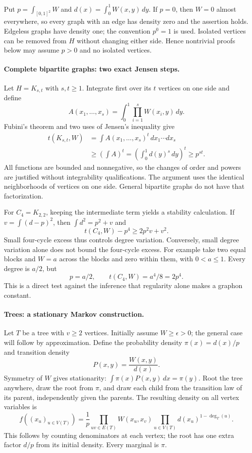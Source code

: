 \documentclass[11pt]{article}
\begin{document}
Put $p=\int_{[0,1]^2}W$ and $d(x)=\int_0^1W(x,y)\,dy$.
If $p=0$, then $W=0$ almost everywhere, so every graph with an edge
has density zero and the assertion holds. Edgeless graphs have density
one; the convention $p^0=1$ is used. Isolated vertices can be removed
from $H$ without changing either side. Hence nontrivial proofs below
may assume $p>0$ and no isolated vertices.

\paragraph{Complete bipartite graphs: two exact Jensen steps.}
Let $H=K_{s,t}$ with $s,t\ge1$. Integrate first over its $t$ vertices
on one side and define
\[
 A(x_1,\ldots,x_s)=\int_0^1\prod_{i=1}^sW(x_i,y)\,dy.
\]
Fubini's theorem and two uses of Jensen's inequality give
\[
 \begin{split}
 t(K_{s,t},W)&=\int A(x_1,\ldots,x_s)^t\,dx_1\cdots dx_s\\
 &\ge\left(\int A\right)^t
   =\left(\int_0^1d(y)^s\,dy\right)^t
   \ge p^{st}.
 \end{split}                                             \tag{1}
\]
All functions are bounded and nonnegative, so the changes of order
and powers are justified without integrability qualifications.
The argument uses the identical neighborhoods of vertices on one
side. General bipartite graphs do not have that factorization.

For $C_4=K_{2,2}$, keeping the intermediate term yields a stability
calculation. If $v=\int(d-p)^2$, then $\int d^2=p^2+v$ and
\[
                     t(C_4,W)-p^4\ge2p^2v+v^2.           \tag{2}
\]
Small four-cycle excess thus controls degree variation. Conversely,
small degree variation alone does not bound the four-cycle excess.
For example take two equal blocks and $W=a$ across the blocks and
zero within them, with $0<a\le1$. Every degree is $a/2$, but
\[
                  p=a/2,\qquad t(C_4,W)=a^4/8=2p^4.
\]
This is a direct test against the inference that regularity alone
makes a graphon constant.

\paragraph{Trees: a stationary Markov construction.}
Let $T$ be a tree with $v\ge2$ vertices. Initially assume $W\ge\epsilon>0$;
the general case will follow by approximation. Define the probability
density $\pi(x)=d(x)/p$ and transition density
\[
                            P(x,y)=\frac{W(x,y)}{d(x)}.
\]
Symmetry of $W$ gives stationarity:
$\int\pi(x)P(x,y)\,dx=\pi(y)$.
Root the tree anywhere, draw the root from $\pi$, and draw each child
from the transition law of its parent, independently given the parents.
The resulting density on all vertex variables is
\[
 f((x_u)_{u\in V(T)})=
 \frac1p\prod_{uv\in E(T)}W(x_u,x_v)
                    \prod_{u\in V(T)}d(x_u)^{1-\deg_T(u)}.\tag{3}
\]
This follows by counting denominators at each vertex; the root has
one extra factor $d/p$ from its initial density. Every marginal is $\pi$.
\end{document}
